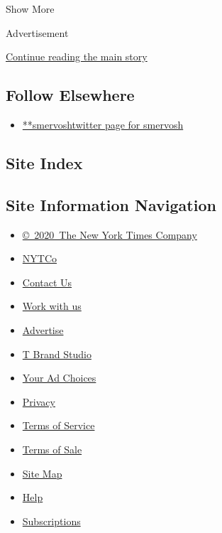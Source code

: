 Show More

Advertisement

\protect\hyperlink{after-mid2}{Continue reading the main story}

\hypertarget{follow-elsewhere}{%
\subsection{Follow Elsewhere}\label{follow-elsewhere}}

\begin{itemize}
\tightlist
\item
  \href{https://twitter.com/smervosh}{**smervoshtwitter page for
  smervosh}
\end{itemize}

\hypertarget{site-index}{%
\subsection{Site Index}\label{site-index}}

\hypertarget{site-information-navigation}{%
\subsection{Site Information
Navigation}\label{site-information-navigation}}

\begin{itemize}
\tightlist
\item
  \href{https://help.nytimes3xbfgragh.onion/hc/en-us/articles/115014792127-Copyright-notice}{©~2020~The
  New York Times Company}
\end{itemize}

\begin{itemize}
\tightlist
\item
  \href{https://www.nytco.com/}{NYTCo}
\item
  \href{https://help.nytimes3xbfgragh.onion/hc/en-us/articles/115015385887-Contact-Us}{Contact
  Us}
\item
  \href{https://www.nytco.com/careers/}{Work with us}
\item
  \href{https://nytmediakit.com/}{Advertise}
\item
  \href{http://www.tbrandstudio.com/}{T Brand Studio}
\item
  \href{https://www.nytimes3xbfgragh.onion/privacy/cookie-policy\#how-do-i-manage-trackers}{Your
  Ad Choices}
\item
  \href{https://www.nytimes3xbfgragh.onion/privacy}{Privacy}
\item
  \href{https://help.nytimes3xbfgragh.onion/hc/en-us/articles/115014893428-Terms-of-service}{Terms
  of Service}
\item
  \href{https://help.nytimes3xbfgragh.onion/hc/en-us/articles/115014893968-Terms-of-sale}{Terms
  of Sale}
\item
  \href{https://spiderbites.nytimes3xbfgragh.onion}{Site Map}
\item
  \href{https://help.nytimes3xbfgragh.onion/hc/en-us}{Help}
\item
  \href{https://www.nytimes3xbfgragh.onion/subscription?campaignId=37WXW}{Subscriptions}
\end{itemize}
